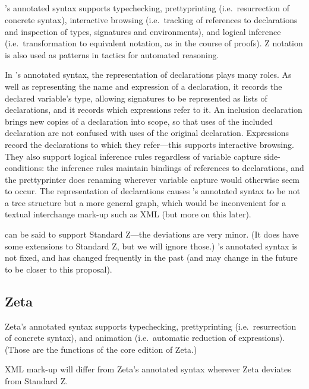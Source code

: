 \documentclass{llncs}  %
\newcommand{\Zeta}{Zeta}
\begin{document}
\subsection{\CADiZ}

\CADiZ's annotated syntax supports typechecking,
prettyprinting (i.e.\ resurrection of concrete syntax),
interactive browsing (i.e.\ tracking of references to declarations
and inspection of types, signatures and environments),
and logical inference (i.e.\ transformation to equivalent notation,
as in the course of proofs).
Z notation is also used as patterns in tactics for automated reasoning.

In \CADiZ's annotated syntax,
the representation of declarations plays many roles.
As well as representing the name and expression of a declaration,
it records the declared variable's type,
allowing signatures to be represented as lists of declarations,
and it records which expressions refer to it.
An inclusion declaration brings new copies of a declaration into scope,
so that uses of the included declaration are not
confused with uses of the original declaration.
Expressions record the declarations to which they refer---this
supports interactive browsing.
They also support logical inference rules
regardless of variable capture side-conditions:
the inference rules maintain bindings of references to declarations,
and the prettyprinter does renaming
wherever variable capture would otherwise seem to occur.
The representation of declarations causes \CADiZ's annotated syntax
to be not a tree structure but a more general graph,
which would be inconvenient for a textual interchange mark-up such as XML
(but more on this later).

\CADiZ\cite{CADiZ} can be said to support Standard Z---the deviations
are very minor.
(It does have some extensions to Standard Z, but we will ignore those.)
\CADiZ's annotated syntax is not fixed, and has changed frequently in the
past (and may change in the future to be closer to this proposal). 

\subsection{\Zeta}

\Zeta's annotated syntax supports typechecking,
prettyprinting (i.e.\ resurrection of concrete syntax),
and animation (i.e.\ automatic reduction of expressions).
(Those are the functions of the core edition of \Zeta.)

XML mark-up will differ from \Zeta's annotated syntax
wherever \Zeta\cite{Zeta} deviates from Standard Z.
\end{document}
